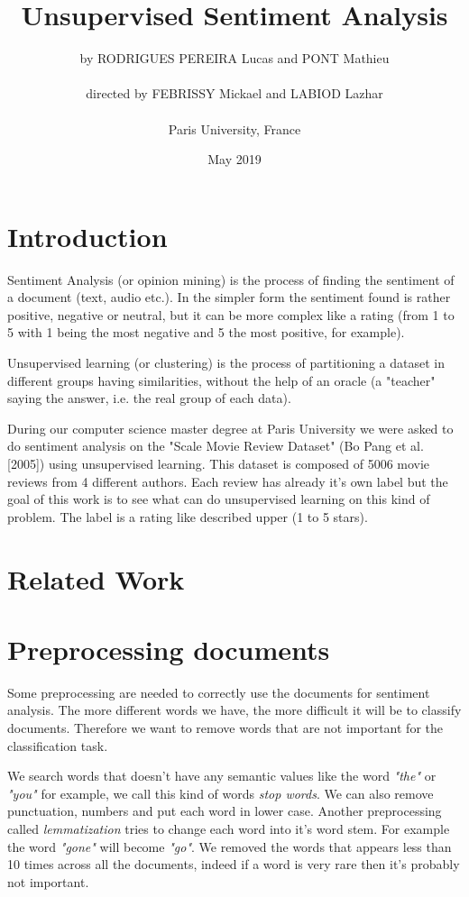\documentclass{article}
\title{Unsupervised Sentiment Analysis}
\author{by RODRIGUES PEREIRA Lucas and PONT Mathieu\\\\directed by FEBRISSY Mickael and LABIOD Lazhar\\\\Paris University, France}
\date{May 2019}
\begin{document}
\maketitle




\section{Introduction}

Sentiment Analysis (or opinion mining) is the process of finding the sentiment of a document (text, audio etc.). In the simpler form the sentiment found is rather positive, negative or neutral, but it can be more complex like a rating (from 1 to 5 with 1 being the most negative and 5 the most positive, for example).

Unsupervised learning (or clustering) is the process of partitioning a dataset in different groups having similarities, without the help of an oracle (a "teacher" saying the answer, i.e. the real group of each data).

During our computer science master degree at Paris University we were asked
to do sentiment analysis on the "Scale Movie Review Dataset" (Bo Pang et al. [2005]) using unsupervised learning. This dataset is composed of 5006 movie reviews from 4 different authors. Each review has already it's own label but the goal of this work is to see what can do unsupervised learning on this kind of problem. The label is a rating like described upper (1 to 5 stars).



\section{Related Work}



\section{Preprocessing documents}

Some preprocessing are needed to correctly use the documents for sentiment analysis. The more different words we have, the more difficult it will be to classify documents. Therefore we want to remove words that are not important for the classification task. 

We search words that doesn't have any semantic values like the word \textit{"the"} or \textit{"you"} for example, we call this kind of words \textit{stop words}. We can also remove punctuation, numbers and put each word in lower case. Another preprocessing called \textit{lemmatization} tries to change each word into it's word stem. For example the word \textit{"gone"} will become \textit{"go"}. We removed the words that appears less than 10 times across all the documents, indeed if a word is very rare then it's probably not important.
\end{document}
